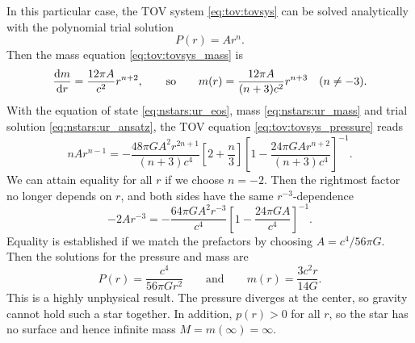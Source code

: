In this particular case, the TOV system \eqref{eq:tov:tovsys} can be solved analytically with the polynomial trial solution
\begin{equation}
	P(r) = A r^n .
\label{eq:nstars:ur_ansatz}
\end{equation}
Then the mass equation \eqref{eq:tov:tovsys_mass} is
\begin{equation}
	\odv{m}{r} = \frac{12 \pi A}{c^2} r^{n+2},
	\qquad \text{so} \qquad
	m(r) = \frac{12 \pi A}{(n+3) c^2} r^{n+3}
	\quad (n \neq -3).
\label{eq:nstars:ur_mass}
\end{equation}
With the equation of state \eqref{eq:nstars:ur_eos}, mass \eqref{eq:nstars:ur_mass} and trial solution \eqref{eq:nstars:ur_ansatz}, the TOV equation \eqref{eq:tov:tovsys_pressure} reads
\begin{equation}
	n A r^{n-1} =
	-\frac{48 \pi G A^2 r^{2n+1}}{(n+3) c^4} \left[ 2 + \frac{n}{3} \right] \left[ 1 - \frac{24 \pi G A r^{n+2}}{(n+3) c^4} \right]^{-1} .
\end{equation}
We can attain equality for all $r$ if we choose $n = -2$.
Then the rightmost factor no longer depends on $r$, and both sides have the same $r^{-3}$-dependence
\begin{equation}
	- 2 A r^{-3} = - \frac{64 \pi G A^2 r^{-3}}{c^4} \left[ 1 - \frac{24 \pi G A}{c^4} \right]^{-1} .
\end{equation}
Equality is established if we match the prefactors by choosing $A = c^4 / 56 \pi G$.
Then the solutions for the pressure and mass are
\begin{equation}
	P(r) = \frac{c^4}{56 \pi G r^2}
	\qquad \text{and} \qquad
	m(r) = \frac{3 c^2 r}{14 G} .
\end{equation}
This is a highly unphysical result.
The pressure diverges at the center, so gravity cannot hold such a star together.
In addition, $p(r) > 0$ for all $r$, so the star has no surface and hence infinite mass $M = m(\infty) = \infty$.

